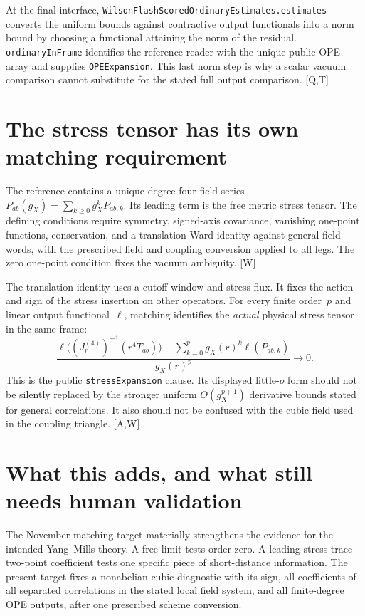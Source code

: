 \documentclass[11pt]{article}
\newcommand{\code}[1]{{\small\nolinkurl{#1}}}
\newcommand{\src}[1]{\textsf{[#1]}}
\begin{document}
At the final interface,
\code{WilsonFlashScoredOrdinaryEstimates.estimates} converts the
uniform bounds against contractive output functionals into a norm
bound by choosing a functional attaining the norm of the residual.
\code{ordinaryInFrame} identifies the reference reader with the unique
public OPE array and supplies \code{OPEExpansion}. This last norm step
is why a scalar vacuum comparison cannot substitute for the stated
full output comparison. \src{Q,T}

\section{The stress tensor has its own matching requirement}

The reference contains a unique degree-four field series
$P_{ab}(g_X)=\sum_{k\ge0}g_X^k P_{ab,k}$. Its leading term is the free
metric stress tensor. The defining conditions require symmetry,
signed-axis covariance, vanishing one-point functions, conservation,
and a translation Ward identity against general field words, with
the prescribed field and coupling conversion applied to all legs.
The zero one-point condition fixes the vacuum ambiguity. \src{W}

The translation identity uses a cutoff window and stress flux. It fixes
the action and sign of the stress insertion on other operators. For
every finite order~$p$ and linear output functional~$\ell$, matching
identifies the \emph{actual} physical stress tensor in the same frame:
\begin{equation}\label{eq:stress}
 \frac{\ell\bigl((J_r^{(4)})^{-1}(r^4T_{ab})\bigr)
       -\sum_{k=0}^{p}g_X(r)^k\ell(P_{ab,k})}
      {g_X(r)^p}\longrightarrow0.
\end{equation}
This is the public \code{stressExpansion} clause. Its displayed
little-$o$ form should not be silently replaced by the stronger
uniform $O(g_X^{p+1})$ derivative bounds stated for general correlations.
It also should not be confused with the cubic field used in the
coupling triangle. \src{A,W}

\section{What this adds, and what still needs human validation}
\label{sec:validation}

The November matching target materially strengthens the evidence for
the intended Yang--Mills theory. A free limit tests order zero. A
leading stress-trace two-point coefficient tests one specific piece
of short-distance information. The present target fixes a nonabelian
cubic diagnostic with its sign, all coefficients of all separated
correlations in the stated local field system, and all finite-degree
OPE outputs, after one prescribed scheme conversion.
\end{document}

